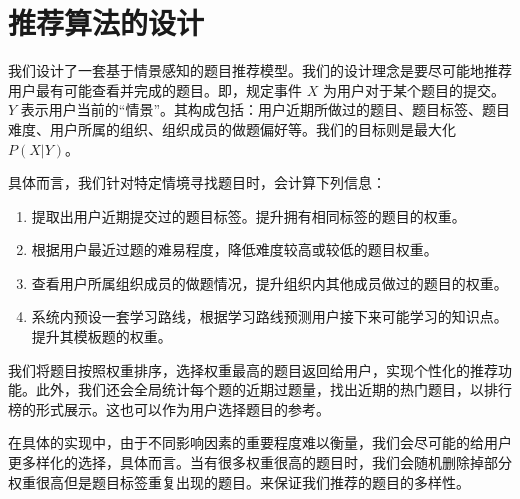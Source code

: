 \section{推荐算法的设计}

我们设计了一套基于情景感知的题目推荐模型。我们的设计理念是要尽可能地推荐用户最有可能查看并完成的题目。即，规定事件 $X$ 为用户对于某个题目的提交。$Y$ 表示用户当前的“情景”。其构成包括：用户近期所做过的题目、题目标签、题目难度、用户所属的组织、组织成员的做题偏好等。我们的目标则是最大化 $P(X|Y)$。

具体而言，我们针对特定情境寻找题目时，会计算下列信息：

\begin{enumerate}
    \item 提取出用户近期提交过的题目标签。提升拥有相同标签的题目的权重。
    \item 根据用户最近过题的难易程度，降低难度较高或较低的题目权重。
    \item 查看用户所属组织成员的做题情况，提升组织内其他成员做过的题目的权重。
    \item 系统内预设一套学习路线，根据学习路线预测用户接下来可能学习的知识点。提升其模板题的权重。
\end{enumerate}

我们将题目按照权重排序，选择权重最高的题目返回给用户，实现个性化的推荐功能。此外，我们还会全局统计每个题的近期过题量，找出近期的热门题目，以排行榜的形式展示。这也可以作为用户选择题目的参考。

在具体的实现中，由于不同影响因素的重要程度难以衡量，我们会尽可能的给用户更多样化的选择，具体而言。当有很多权重很高的题目时，我们会随机删除掉部分权重很高但是题目标签重复出现的题目。来保证我们推荐的题目的多样性。
